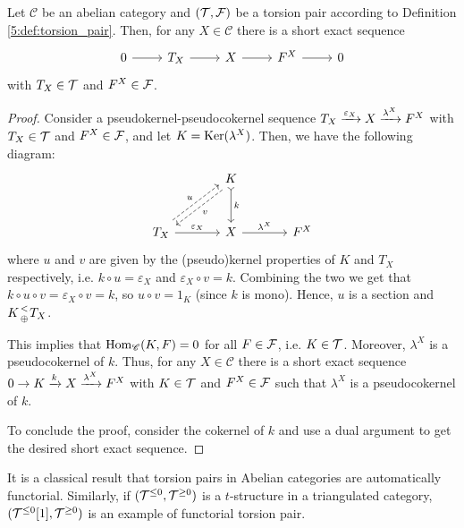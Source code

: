 \begin{lemma}
  Let $\mathscr{C}$ be an abelian category and $(\mathcal{T},\mathcal{F})$ be a torsion pair according to Definition \ref{5:def:torsion_pair}. Then, for any $X\in\mathscr{C}$ there is a short exact sequence
  \begin{equation*}
    \begin{tikzcd}
      0\arrow{r}&T_X\arrow{r}&X\arrow{r}&F^X\arrow{r}&0
    \end{tikzcd}
  \end{equation*}
  with $T_X\in\mathcal{T}$ and $F^X\in\mathcal{F}$.
\end{lemma}

\begin{proof}
  Consider a pseudokernel-pseudocokernel sequence $T_X\xrightarrow{\varepsilon_X} X\xrightarrow{\lambda^X} F^X$ with $T_X\in \mathcal{T}$ and $F^X\in\mathcal{F}$, and let $K=\operatorname{Ker}(\lambda^X)$. Then, we have the following diagram:
  \begin{equation*}
    \begin{tikzcd}[column sep=large,row sep=large]
      & K\arrow[tail]{d}{k}\arrow[dashed,shift left]{dl}{v}
        &\\
      T_X\arrow{r}{\varepsilon_X}\arrow[dashed,shift left]{ur}{u}
      & X\arrow{r}{\lambda^X}
        & F^X
    \end{tikzcd}
  \end{equation*}
  where $u$ and $v$ are given by the (pseudo)kernel properties of $K$ and $T_X$ respectively, i.e. $k\circ u=\varepsilon_X$ and $\varepsilon_X\circ v = k$. Combining the two we get that $k\circ u\circ v = \varepsilon_X\circ v = k$, so $u\circ v=1_K$ (since $k$ is mono). Hence, $u$ is a section and $K {< \atop \oplus} T_X$.

  This implies that $\operatorname{Hom}_\mathscr{C}(K,F)=0$ for all $F\in\mathcal{F}$, i.e. $K\in\mathcal{T}$. Moreover, $\lambda^X$ is a pseudocokernel of $k$. Thus, for any $X\in\mathscr{C}$ there is a short exact sequence $0\to K\xrightarrow{k} X\xrightarrow{\lambda^X} F^X$ with $K\in\mathcal{T}$ and $F^X\in\mathcal{F}$ such that $\lambda^X$ is a pseudocokernel of $k$.

  To conclude the proof, consider the cokernel of $k$ and use a dual argument to get the desired short exact sequence.
\end{proof}


It is a classical result that torsion pairs in Abelian categories are automatically functorial. Similarly, if $(\mathcal{T}^{\leq 0},\mathcal{T}^{\geq 0})$ is a $t$-structure in a triangulated category, $(\mathcal{T}^{\leq 0}[1],\mathcal{T}^{\geq 0})$ is an example of functorial torsion pair.

